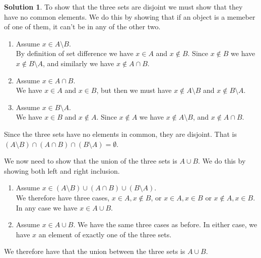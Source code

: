 \documentclass[a4paper, twocolumn]{report}
\theoremstyle{definition}
\theoremstyle{solution}
\newtheorem*{sltn}{Solution}
\newcommand{\union}{\cup}
\newcommand{\intrsct}{\cap}
\begin{document}
\begin{sltn}
  To show that the three sets are disjoint we must show that they have no common elements.
  We do this by showing that if an object is a memeber of one of them, it can't be in any of the other two.
  \begin{enumerate}
    \item Assume $x \in A \setminus B$. \\
      [0.2cm]
      By definition of set difference we have $x \in A$ and $x \notin B$.
      Since $x \notin B$ we have $x \notin B \setminus A$, and similarly we
      have $x \notin A \intrsct B$.

    \item Assume $x \in A \intrsct B$. \\
      [0.2cm]
      We have $x \in A$ and $x \in B$, but then we must have $x \notin A
      \setminus B$ and $x \notin B \setminus A$. 

    \item Assume $x \in B \setminus A$. \\
      [0.2cm]
      We have $x \in B$ and $x \notin A$. Since $x \notin A$ we have $x \notin
      A \setminus B$, and $x \notin A \intrsct B$.
  \end{enumerate}

  Since the three sets have no elements in common, they are disjoint. That is
  $\left( A \setminus B \right) \intrsct \left( A \intrsct B \right) \intrsct
  \left( B\setminus A \right) = \emptyset$.

  We now need to show that the union of the three sets is $A \union B$.
  We do this by showing both left and right inclusion.

  \begin{enumerate}
    \item Assume $x \in (A \setminus B)\union (A\intrsct B) \union (B\setminus A)$.\\
      [0.2cm]
      We therefore have three cases, $x \in A, x \notin B$, or $x \in A, x \in
      B$ or $x \notin A, x \in B$. In any case we have $x \in A \union B$.

    \item Assume $x \in A \union B$.
      We have the same three cases as before. In either case, we have $x$ an
      element of exactly one of the three sets.
  \end{enumerate}

  We therefore have that the union between the three sets is $A \union B$.
\end{sltn}
\end{document}
